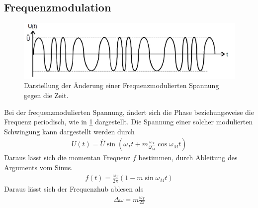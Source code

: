 \newpage
\subsection{Frequenzmodulation}
\begin{figure}[h!]
	\centering
	\includegraphics[width = \textwidth]{../Grafiken/Frequenzmodulation.pdf}
	\caption{Darstellung der Änderung einer Frequenzmodulierten Spannung gegen die Zeit.\cite{V59}\label{fig:Frequenzmodulation}}
\end{figure}
Bei der frequenzmodulierten Spannung, ändert sich die Phase beziehungsweise die Frequenz periodisch, wie in \cref{fig:Frequenzmodulation} dargestellt.
Die Spannung einer solcher modulierten Schwingung kann dargestellt werden durch
\begin{align}
	U(t)=\hat U \sin\left(\omega_Tt+m\frac{\omega_T}{\omega_M}\cos\omega_Mt\right)
\end{align}
Daraus lässt sich die momentan Frequenz $f$ bestimmen, durch Ableitung des Arguments vom Sinus.
\begin{align}
	f(t)=\frac{\omega_T}{2\pi}\left(1-m\sin\omega_Mt\right)
\end{align}
Daraus lässt sich der Frequenzhub ablesen als
\begin{align}
	\Delta \omega = m\frac{\omega_T}{2\pi}
	\label{eq:frequenzhub}
\end{align}
